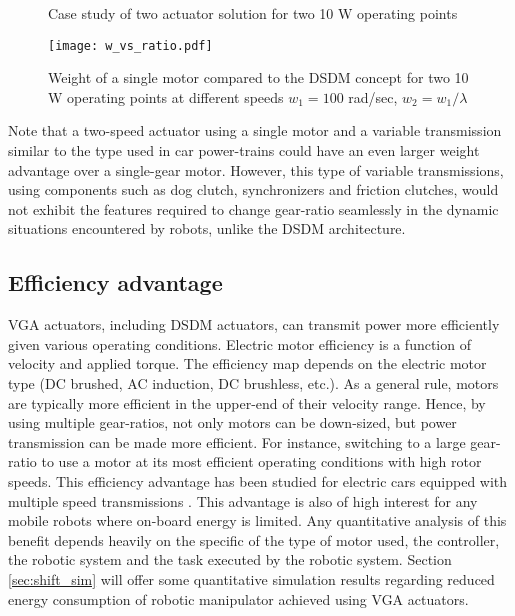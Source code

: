 \begin{figure}[H]
        \centering
        \caption{Case study of two actuator solution for two 10 W operating points }\label{fig:solutions}
\end{figure}

\begin{figure}[H]
	\centering
		\texttt{[image: w\_vs\_ratio.pdf]}
	\caption[DSDM weight analysis]{Weight of a single motor compared to the DSDM concept for two 10 W operating points at different speeds $w_1=100$ rad/sec, $w_2 = w_1 / \lambda$}
	\label{fig:1vs2}
\end{figure}

Note that a two-speed actuator using a single motor and a variable transmission similar to the type used in car power-trains could have an even larger weight advantage over a single-gear motor. However, this type of variable transmissions, using components such as dog clutch, synchronizers and friction clutches, would not exhibit the features required to change gear-ratio seamlessly in the dynamic situations encountered by robots, unlike the DSDM architecture.

\subsection{Efficiency advantage}
\label{sec:EffAdvantage}

VGA actuators, including DSDM actuators, can transmit power more efficiently given various operating conditions. Electric motor efficiency is a function of velocity and applied torque. The efficiency map depends on the electric motor type (DC brushed, AC induction, DC brushless, etc.). As a general rule, motors are typically more efficient in the upper-end of their velocity range. Hence, by using multiple gear-ratios, not only motors can be down-sized, but power transmission can be made more efficient. For instance, switching to a large gear-ratio to use a motor at its most efficient operating conditions with high rotor speeds. This efficiency advantage has been studied for electric cars equipped with multiple speed transmissions \cite{ren_effect_2009} \cite{holdstock_energy_2012} \cite{zhang_three-speed_2013} \cite{mckeegan_antonovs_2011}. This advantage is also of high interest for any mobile robots where on-board energy is limited. Any quantitative analysis of this benefit depends heavily on the specific of the type of motor used, the controller, the robotic system and the task executed by the robotic system. Section \ref{sec:shift_sim} will offer some quantitative simulation results regarding reduced energy consumption of robotic manipulator achieved using VGA actuators.


